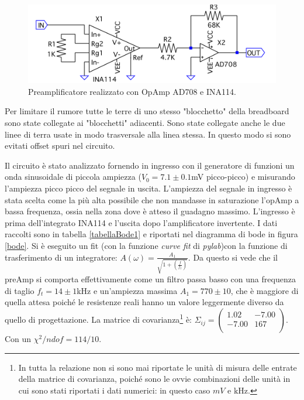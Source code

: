 \documentclass[10pt,a4paper]{article}
\begin{document}
\begin{figure}[!htb]
\centering
\includegraphics[scale=0.5]{preamp.png}
\caption{Preamplificatore realizzato con OpAmp AD708 e INA114.\label{preamp}}
\end{figure}


Per limitare il rumore tutte le terre di uno stesso "blocchetto" della breadboard sono state collegate ai "blocchetti" adiacenti. Sono state collegate anche le due linee di terra usate in modo trasversale alla linea stessa. In questo modo si sono evitati offset spuri nel circuito. %

Il circuito è stato analizzato fornendo in ingresso con il generatore di funzioni un onda sinusoidale di piccola ampiezza ($V_0 = 7.1 \pm 0.1$mV picco-picco) e misurando l'ampiezza picco picco del segnale in uscita. L'ampiezza del segnale in ingresso è stata scelta come la più alta possibile che non mandasse in saturazione l'opAmp a bassa frequenza, ossia nella zona dove è atteso il guadagno massimo. L'ingresso è prima dell'integrato INA114 e l'uscita dopo l'amplificatore invertente. %
I dati raccolti sono in tabella \ref{tabellaBode1} e riportati nel diagramma di bode in figura \ref{bode}.
Si è eseguito un fit (con la funzione \emph{curve fit} di \emph{pylab})con la funzione di trasferimento di un integratore: $A(\omega) = \frac{A_1}{\sqrt{1+\left( \frac{f}{f_t} \right) }}$. Da questo si vede che il preAmp si comporta effettivamente come un filtro passa basso con una frequenza di taglio $f_t = 14 \pm 1$kHz e un'ampiezza massima $A_{1} = 770 \pm 10$, che è maggiore di quella attesa poiché le resistenze reali hanno un valore leggermente diverso da quello di progettazione. La matrice di covarianza\footnote{In tutta la relazione non si sono mai riportate le unità di misura delle entrate della matrice di covarianza, poiché sono le ovvie combinazioni delle unità in cui sono stati riportati i dati numerici: in questo caso $mV$ e $\mbox{kHz}$.} è: $\Sigma_{ij} = \left( \begin{array}{cc}
1.02 & -7.00\\ 
-7.00 & 167\\
\end{array} \right)$. Con un $\chi^2/ndof = 114/10$.
\end{document}
